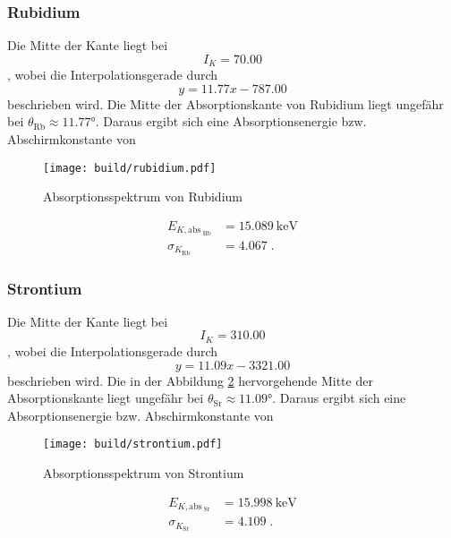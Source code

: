 \subsubsection{Rubidium}
Die Mitte der Kante liegt bei 
\begin{equation*}
    I_K = 70.00
\end{equation*}
, wobei die Interpolationsgerade durch 
\begin{equation*}
    y = 11.77x - 787.00
\end{equation*}
beschrieben wird.
Die Mitte der Absorptionskante von Rubidium liegt ungefähr bei $\theta_\text{Rb} \approx \ang{11.77;;}$. Daraus ergibt sich eine Absorptionsenergie bzw. Abschirmkonstante von 
\begin{figure}
    \centering
    \caption{Absorptionsspektrum von Rubidium}
    \label{fig:Rubidium}
    \texttt{[image: build/rubidium.pdf]}
\end{figure}
\begin{align*}
    E_{K, \text{abs}_\text{ Rb}}  &= \SI{15.089}{\kilo\electronvolt} \\
    \sigma_{K_\text{Rb}}         &= \num{4.067} \; \text{.}
\end{align*}
\FloatBarrier
\subsubsection{Strontium}
Die Mitte der Kante liegt bei 
\begin{equation*}
    I_K = 310.00
\end{equation*}
, wobei die Interpolationsgerade durch 
\begin{equation*}
    y = 11.09x -3321.00
\end{equation*}
beschrieben wird.
Die in der Abbildung \ref{fig:Strontium} hervorgehende Mitte der Absorptionskante liegt ungefähr bei $\theta_\text{Sr} \approx \ang{11.09;;}$. 
Daraus ergibt sich eine Absorptionsenergie bzw. Abschirmkonstante von 
\begin{figure}
    \centering
    \caption{Absorptionsspektrum von Strontium}
    \label{fig:Strontium}
    \texttt{[image: build/strontium.pdf]}
\end{figure}
\begin{align*}
    E_{K, \text{abs}_\text{ Sr}}  &= \SI{15.998}{\kilo\electronvolt} \\
    \sigma_{K_\text{Sr}}         &= \num{4.109} \; \text{.}
\end{align*}
\FloatBarrier
